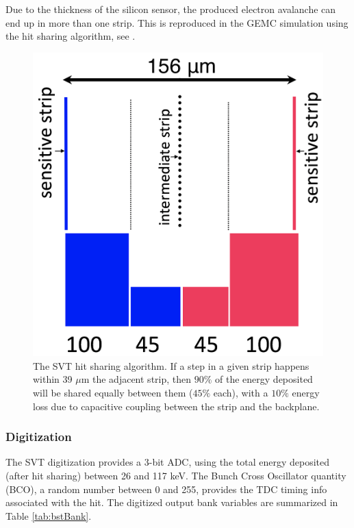 Due to the thickness of the silicon sensor, the produced electron avalanche can end up in more than one strip. This
is reproduced in the GEMC simulation using the hit sharing algorithm, see .

\begin{figure}[t]
	\centering
	\includegraphics[width=0.99\columnwidth, height=0.65\columnwidth]{img/bstHitSharing.png}
	\caption{The SVT hit sharing algorithm. If a step in a given strip happens within 39 $\mu$m the adjacent strip, then
             $90\%$ of the energy deposited will be shared equally between them ($45\%$ each), with a $10\%$ energy loss due
	         to capacitive coupling between the strip and the backplane.}
	\label{fig:bstHitSharing}
\end{figure}


\subsubsection{Digitization}

The SVT digitization provides a 3-bit ADC, using the total energy deposited (after hit sharing) between 26 and 117 keV.
The Bunch Cross Oscillator quantity (BCO), a random number between 0 and 255,
provides the TDC timing info associated with the hit.
The digitized output bank variables are summarized in Table \ref{tab:bstBank}.

